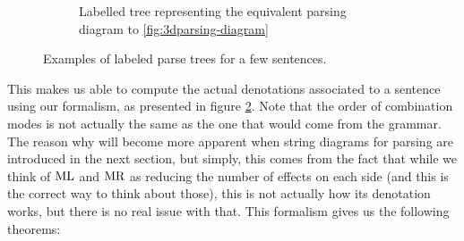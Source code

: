 \begin{figure}
	\begin{subfigure}{.45\textwidth}
		\centering
		\caption{Labelled tree representing the equivalent parsing diagram to
			\ref{fig:3dparsing-diagram}}
		\label{fig:tree-rain}
	\end{subfigure}
	\caption{Examples of labeled parse trees for a few sentences.}
	\label{fig:parsing-trees}
\end{figure}

This makes us able to compute the actual denotations associated to a sentence
using our formalism, as presented in figure \ref{fig:parsing-trees}.
Note that the order of combination modes is not actually the same as the one
that would come from the grammar.
The reason why will become more apparent when string diagrams for parsing are
introduced in the next section, but simply, this comes from the fact that while
we think of $\text{ML}$ and $\text{MR}$ as reducing the number of effects on each
side (and this is the correct way to think about those), this is not actually
how its denotation works, but there is no real issue with that.
This formalism gives us the following theorems:

